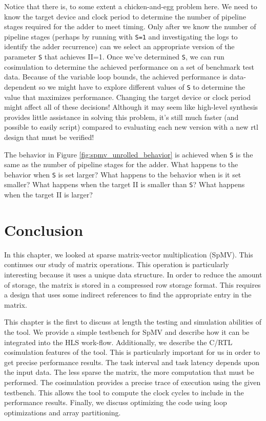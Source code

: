 Notice that there is, to some extent a chicken-and-egg problem here.   We need to know the target device and clock period to determine the number of pipeline stages required for the adder to meet timing.  Only after we know the number of pipeline stages (perhaps by running with \lstinline|S=1| and investigating the \VHLS logs to identify the adder recurrence) can we select an appropriate version of the parameter \lstinline|S| that achieves II=1.  Once we've determined \lstinline|S|, we can run \gls{cosimulation} to determine the achieved performance on a set of benchmark test data.  Because of the variable loop bounds, the achieved performance is data-dependent so we might have to explore different values of \lstinline|S| to determine the value that maximizes performance.  Changing the target device or clock period might affect all of these decisions!  Although it may seem like high-level synthesis provides little assistance in solving this problem, it's still much faster (and possible to easily script) compared to evaluating each new version with a new \gls{rtl} design that must be verified!  

\begin{exercise}
The behavior in Figure \ref{fig:spmv_unrolled_behavior} is achieved when \lstinline|S| is the same as the number of pipeline stages for the adder.   What happens to the behavior when \lstinline|S| is set larger?  What happens to the behavior when is it set smaller?  What happens when the target II is smaller than \lstinline|S|?  What happens when the target II is larger?
\end{exercise}


\section{Conclusion}
In this chapter, we looked at sparse matrix-vector multiplication (SpMV). This continues our study of matrix operations. This operation is particularly interesting because it uses a unique data structure. In order to reduce the amount of storage, the matrix is stored in a compressed row storage format. This requires a design that uses some indirect references to find the appropriate entry in the matrix. 

This chapter is the first to discuss at length the testing and simulation abilities of the \VHLS tool. We provide a simple testbench for SpMV and describe how it can be integrated into the HLS work-flow. Additionally, we describe the C/RTL cosimulation features of the \VHLS tool. This is particularly important for us in order to get precise performance results. The task interval and task latency depends upon the input data. The less sparse the matrix, the more computation that must be performed. The cosimulation provides a precise trace of execution using the given testbench. This allows the tool to compute the clock cycles to include in the performance results.  Finally, we discuss optimizing the code using loop optimizations and array partitioning. 